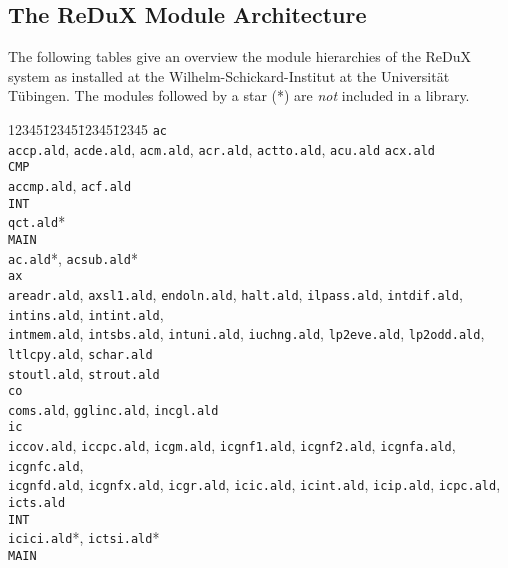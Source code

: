 \subsection{The ReDuX Module Architecture}

The following tables give an overview the module hierarchies of the
ReDuX system as installed at the Wilhelm-Schickard-Institut at the
Universit\"{a}t T\"{u}bingen.
The modules followed by a star (*) are {\em not} included in a library.

{\small
\begin{tabbing}
12345\=12345\=12345\=12345  \kill
 {\tt ac} \+  \\
  {\tt accp.ald}, {\tt acde.ald}, {\tt acm.ald}, {\tt acr.ald}, 
  {\tt actto.ald},  {\tt acu.ald} {\tt acx.ald}\\
  {\tt CMP} \+ \\
       {\tt accmp.ald}, {\tt acf.ald} \- \\
  {\tt INT} \+ \\
        {\tt qct.ald}* \- \\
  {\tt MAIN} \+ \\
        {\tt ac.ald}*, {\tt acsub.ald}* \- \- \\
 {\tt ax} \+ \\
    {\tt areadr.ald}, {\tt axsl1.ald}, {\tt endoln.ald}, {\tt halt.ald},
    {\tt ilpass.ald}, {\tt intdif.ald},  {\tt intins.ald}, {\tt intint.ald}, \\
    {\tt intmem.ald}, {\tt intsbs.ald}, {\tt intuni.ald}, {\tt iuchng.ald},
    {\tt lp2eve.ald}, {\tt lp2odd.ald}, {\tt ltlcpy.ald}, {\tt schar.ald} \\
    {\tt stoutl.ald}, {\tt strout.ald}   \- \\
 {\tt co} \+ \\
    {\tt coms.ald},
    {\tt gglinc.ald}, 
    {\tt incgl.ald}  \- \\
 {\tt ic} \+ \\
    {\tt iccov.ald}, 
    {\tt iccpc.ald}, 
    {\tt icgm.ald}, 
    {\tt icgnf1.ald}, 
    {\tt icgnf2.ald}, 
    {\tt icgnfa.ald}, 
    {\tt icgnfc.ald}, \\
    {\tt icgnfd.ald}, 
    {\tt icgnfx.ald}, 
    {\tt icgr.ald}, 
    {\tt icic.ald}, 
    {\tt icint.ald}, 
    {\tt icip.ald}, 
    {\tt icpc.ald},
    {\tt icts.ald}  \\
    {\tt INT} \+ \\
       {\tt icici.ald}*,
       {\tt ictsi.ald}* \- \\
    {\tt MAIN} \+ \\

\end{tabbing}}
